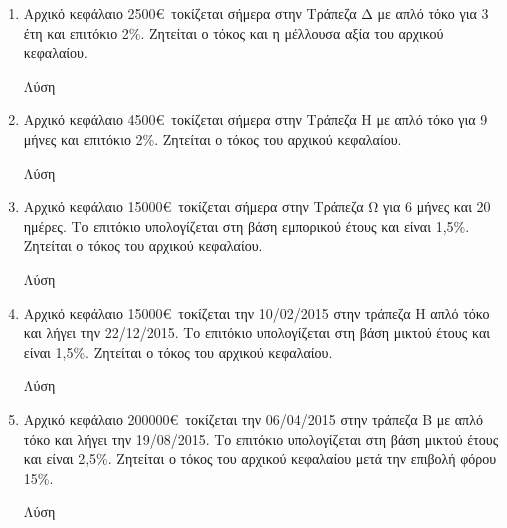 \documentclass[a4paper,12pt]{article}
\begin{document}
\begin{center}
\end{center}

\vspace{1cm}

\begin{enumerate}
\item Αρχικό κεφάλαιο 2500\euro\ τοκίζεται σήμερα στην Τράπεζα Δ με απλό τόκο για 3 έτη και επιτόκιο 2\%. Ζητείται ο τόκος και η μέλλουσα αξία του αρχικού κεφαλαίου.

\hspace{.15\textwidth}Λύση

\vspace{3cm}

\item Αρχικό κεφάλαιο 4500\euro\ τοκίζεται σήμερα στην Τράπεζα Η με απλό τόκο για 9 μήνες και επιτόκιο 2\%. Ζητείται ο τόκος του αρχικού κεφαλαίου.

\hspace{.15\textwidth}Λύση

\vspace{3cm}

\item Αρχικό κεφάλαιο 15000\euro\ τοκίζεται σήμερα στην Τράπεζα Ω για 6 μήνες και 20 ημέρες. Το επιτόκιο υπολογίζεται στη βάση εμπορικού έτους και είναι 1,5\%. Ζητείται ο τόκος του αρχικού κεφαλαίου. 

\hspace{.15\textwidth}Λύση

\vspace{3cm}

\item Αρχικό κεφάλαιο 15000\euro\ τοκίζεται την 10/02/2015 στην τράπεζα Η απλό τόκο και λήγει την 22/12/2015. Το επιτόκιο υπολογίζεται στη βάση μικτού έτους και είναι 1,5\%. Ζητείται ο τόκος του αρχικού κεφαλαίου. 

\hspace{.15\textwidth}Λύση

\vspace{3cm}

\newpage

\item Αρχικό κεφάλαιο 200000\euro\ τοκίζεται την 06/04/2015 στην τράπεζα Β με απλό τόκο και λήγει την 19/08/2015. Το επιτόκιο υπολογίζεται στη βάση μικτού έτους και είναι 2,5\%. Ζητείται ο τόκος του αρχικού κεφαλαίου μετά την επιβολή φόρου 15\%.

\hspace{.15\textwidth}Λύση


\end{enumerate}
\end{document}
